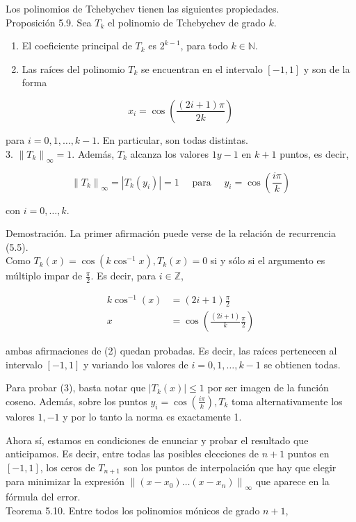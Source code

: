 \documentclass[10pt]{article}
\begin{document}
Los polinomios de Tchebychev tienen las siguientes propiedades.\\
Proposición 5.9. Sea $T_{k}$ el polinomio de Tchebychev de grado $k$.

\begin{enumerate}
  \item El coeficiente principal de $T_{k}$ es $2^{k-1}$, para todo $k \in \mathbb{N}$.
  \item Las raíces del polinomio $T_{k}$ se encuentran en el intervalo $[-1,1]$ y son de la forma
\end{enumerate}

$$
x_{i}=\cos \left(\frac{(2 i+1) \pi}{2 k}\right)
$$

para $i=0,1, \ldots, k-1$. En particular, son todas distintas.\\
3. $\left\|T_{k}\right\|_{\infty}=1$. Además, $T_{k}$ alcanza los valores $1 y-1$ en $k+1$ puntos, es decir,

$$
\left\|T_{k}\right\|_{\infty}=\left|T_{k}\left(y_{i}\right)\right|=1 \quad \text { para } \quad y_{i}=\cos \left(\frac{i \pi}{k}\right)
$$

con $i=0, \ldots, k$.

Demostración. La primer afirmación puede verse de la relación de recurrencia (5.5).\\
Como $T_{k}(x)=\cos \left(k \cos ^{-1} x\right), T_{k}(x)=0$ si y sólo si el argumento es múltiplo impar de $\frac{\pi}{2}$. Es decir, para $i \in \mathbb{Z}$,

$$
\begin{aligned}
k \cos ^{-1}(x) & =(2 i+1) \frac{\pi}{2} \\
x & =\cos \left(\frac{(2 i+1)}{k} \frac{\pi}{2}\right)
\end{aligned}
$$

ambas afirmaciones de (2) quedan probadas. Es decir, las raíces pertenecen al intervalo $[-1,1]$ y variando los valores de $i=0,1, \ldots, k-1$ se obtienen todas.

Para probar (3), basta notar que $\left|T_{k}(x)\right| \leq 1$ por ser imagen de la función coseno. Además, sobre los puntos $y_{i}=\cos \left(\frac{i \pi}{k}\right), T_{k}$ toma alternativamente los valores $1,-1$ y por lo tanto la norma es exactamente 1.

Ahora sí, estamos en condiciones de enunciar y probar el resultado que anticipamos. Es decir, entre todas las posibles elecciones de $n+1$ puntos en $[-1,1]$, los ceros de $T_{n+1}$ son los puntos de interpolación que hay que elegir para minimizar la expresión $\left\|\left(x-x_{0}\right) \ldots\left(x-x_{n}\right)\right\|_{\infty}$ que aparece en la fórmula del error.\\
Teorema 5.10. Entre todos los polinomios mónicos de grado $n+1$,
\end{document}
